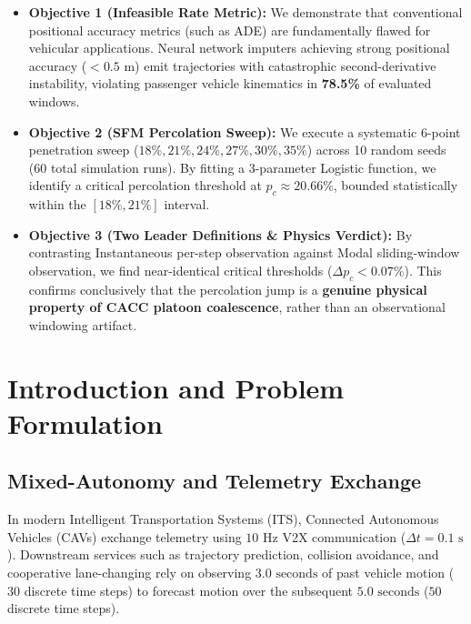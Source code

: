\documentclass[11pt,a4paper]{article}
\begin{document}
\begin{itemize}[leftmargin=1.5em, itemsep=3.5pt]
    \item \textbf{Objective 1 (Infeasible Rate Metric):} We demonstrate that conventional positional accuracy metrics (such as ADE) are fundamentally flawed for vehicular applications. Neural network imputers achieving strong positional accuracy ($< 0.5\text{ m}$) emit trajectories with catastrophic second-derivative instability, violating passenger vehicle kinematics in \textbf{78.5\%} of evaluated windows.
    \item \textbf{Objective 2 (SFM Percolation Sweep):} We execute a systematic 6-point penetration sweep ($18\%, 21\%, 24\%, 27\%, 30\%, 35\%$) across 10 random seeds (60 total simulation runs). By fitting a 3-parameter Logistic function, we identify a critical percolation threshold at $p_c \approx 20.66\%$, bounded statistically within the $[18\%, 21\%]$ interval.
    \item \textbf{Objective 3 (Two Leader Definitions \& Physics Verdict):} By contrasting Instantaneous per-step observation against Modal sliding-window observation, we find near-identical critical thresholds ($\Delta p_c < 0.07\%$). This confirms conclusively that the percolation jump is a \textbf{genuine physical property of CACC platoon coalescence}, rather than an observational windowing artifact.
\end{itemize}

\vspace{1.0em}

\section{Introduction and Problem Formulation}

\subsection{Mixed-Autonomy and Telemetry Exchange}
In modern Intelligent Transportation Systems (ITS), Connected Autonomous Vehicles (CAVs) exchange telemetry using $10\text{ Hz}$ V2X communication ($\Delta t = 0.1\text{ s}$). Downstream services such as trajectory prediction, collision avoidance, and cooperative lane-changing rely on observing $3.0\text{ seconds}$ of past vehicle motion ($30$ discrete time steps) to forecast motion over the subsequent $5.0\text{ seconds}$ ($50$ discrete time steps).
\end{document}
